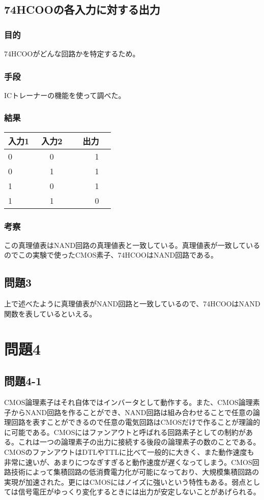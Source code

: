 \documentclass{jsarticle}
\begin{document}
\subsection{74HCOOの各入力に対する出力}
\subsubsection{目的}
74HCOOがどんな回路かを特定するため。　
\subsubsection{手段}
ICトレーナーの機能を使って調べた。
\subsubsection{結果}
\begin{table}[htb]
    \begin{tabular}{|l|c|r|r} \hline
        入力1 & 入力2　& 出力　\\ \hline \hline
        0 & 0 & 1 \\ \hline
        0 & 1 & 1 \\ \hline
        1 & 0 & 1 \\ \hline
        1 & 1 & 0 \\ \hline
    \end{tabular}
\end{table}
\subsubsection{考察}
この真理値表はNAND回路の真理値表と一致している。真理値表が一致しているのでこの実験で使ったCMOS素子、74HCOOはNAND回路である。
\subsection{問題3}
上で述べたように真理値表がNAND回路と一致しているので、74HCOOはNAND関数を表しているといえる。

\section{問題4}
\subsection{問題4-1}
CMOS論理素子はそれ自体ではインバータとして動作する。また、CMOS論理素子からNAND回路を作ることができ、NAND回路は組み合わせることで任意の論理回路を表すことができるので任意の電気回路はCMOSだけで作ることが理論的に可能である。CMOSにはファンアウトと呼ばれる回路素子としての制約がある。これは一つの論理素子の出力に接続する後段の論理素子の数のことである。CMOSのファンアウトはDTLやTTLに比べて一般的に大きく、また動作速度も非常に速いが、あまりにつなぎすぎると動作速度が遅くなってしまう。CMOS回路技術によって集積回路の低消費電力化が可能になっており、大規模集積回路の実現が加速された。更にはCMOSにはノイズに強いという特性もある。弱点としては信号電圧がゆっくり変化するときには出力が安定しないことがあげられる。
\end{document}
